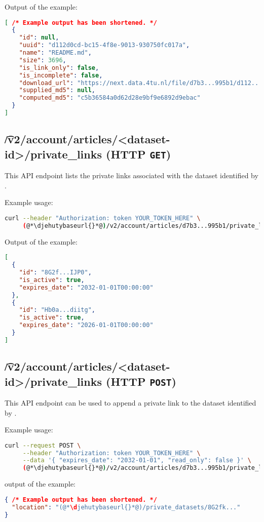   Output of the example:
\begin{lstlisting}[language=JSON]
[ /* Example output has been shortened. */
  {
    "id": null,
    "uuid": "d112d0cd-bc15-4f8e-9013-930750fc017a",
    "name": "README.md",
    "size": 3696,
    "is_link_only": false,
    "is_incomplete": false,
    "download_url": "https://next.data.4tu.nl/file/d7b3...995b1/d112...c017a",
    "supplied_md5": null,
    "computed_md5": "c5b36584a0d62d28e9bf9e6892d9ebac"
  }
]
\end{lstlisting}

\subsection{\t{/v2/account/articles/<dataset-id>/private\_links} (HTTP \texttt{GET})}

  This API endpoint lists the private links associated with the dataset
  identified by .

  Example usage:
\begin{lstlisting}[language=bash]
curl --header "Authorization: token YOUR_TOKEN_HERE" \
     (@*\djehutybaseurl{}*@)/v2/account/articles/d7b3...995b1/private_links | jq
\end{lstlisting}

  Output of the example:
\begin{lstlisting}[language=JSON]
[
  {
    "id": "8G2f...IJP0",
    "is_active": true,
    "expires_date": "2032-01-01T00:00:00"
  },
  {
    "id": "Hb0a...diitg",
    "is_active": true,
    "expires_date": "2026-01-01T00:00:00"
  }
]
\end{lstlisting}

\subsection{\t{/v2/account/articles/<dataset-id>/private\_links} (HTTP \texttt{POST})}

  This API endpoint can be used to append a private link to the dataset
  identified by \code{dataset-id}.

  Example usage:
\begin{lstlisting}[language=bash]
curl --request POST \
     --header "Authorization: token YOUR_TOKEN_HERE" \
     --data '{ "expires_date": "2032-01-01", "read_only": false }' \
     (@*\djehutybaseurl{}*@)/v2/account/articles/d7b3...995b1/private_links | jq
\end{lstlisting}

  output of the example:
\begin{lstlisting}[language=JSON]
{ /* Example output has been shortened. */
  "location": "(@*\djehutybaseurl{}*@)/private_datasets/8G2fk..."
}
\end{lstlisting}

